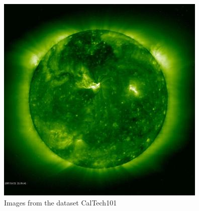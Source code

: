 \documentclass[oneside,a4paper,english,links]{amca}
\begin{document}
\begin{figure}[htb]
\includegraphics[scale=0.28]{exps/100sample/res/image_0309}
\caption{Images from the dataset CalTech101}
\label{fig:nonbread}
\end{figure}
\end{document}
